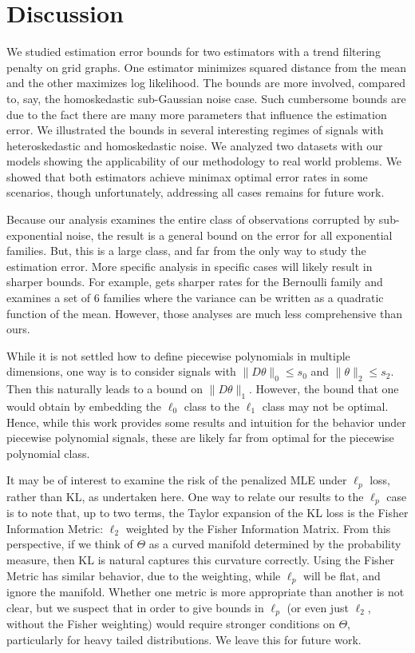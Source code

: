\documentclass[ejs,noshowframe]{imsart}
\theoremstyle{plain}
\theoremstyle{definition}
\begin{document}
\section{Discussion}
We studied estimation error bounds for two estimators with a trend filtering
penalty on grid graphs. One estimator minimizes squared distance from the mean
and the other maximizes log likelihood. The bounds are more involved, compared
to, say, the homoskedastic sub-Gaussian noise case. Such cumbersome bounds are
due 
to the fact there are many more parameters that influence the estimation error.
We illustrated the bounds in several interesting regimes of signals with
heteroskedastic and homoskedastic noise. We analyzed two datasets with our
models showing the applicability of our methodology to real world problems. We
showed that both estimators achieve minimax optimal error rates in some
scenarios, though unfortunately, addressing all cases remains for future work.

Because our analysis examines the entire class of observations corrupted by
sub-exponential noise, the result is a general bound on the error for all exponential families. But,
this is a large class, and far from the only way to study the estimation error.
More specific analysis in specific cases will likely result in sharper bounds.
For example, \cite{vandeGeer2020logistic} gets sharper rates for the Bernoulli
family and \cite{brown2010nonparametric} examines a set of 6 families where the
variance can be written as a quadratic function of the mean. However, those
analyses are much less comprehensive than ours.

While it is not settled how to define piecewise polynomials in multiple
dimensions, one way is to consider signals with $\| D \theta \|_0 \le s_0$ and
$\| \theta \|_2 \le s_2$.  Then this naturally leads to a bound on $\| D \theta
\|_1$. However, the bound that one would obtain by embedding the $\ell_0$ class
to the $\ell_1$ class may not be optimal. Hence, while this work provides some
results and intuition for the behavior under piecewise polynomial signals, these
are likely far from optimal for the piecewise polynomial class.

It may be of interest to examine the risk of the penalized MLE under $\ell_p$
loss, rather than KL, as undertaken here. One way to relate our results to the
$\ell_p$ case is to note that, up to two terms, the Taylor expansion of the KL
loss is the Fisher Information Metric: $\ell_2$ weighted by the Fisher
Information Matrix. From this perspective, if we think of $\Theta$ as a curved
manifold determined by the probability measure, then KL is natural captures this
curvature correctly. Using the Fisher Metric has similar behavior, due to the
weighting, while $\ell_p$ will be flat, and ignore the manifold. Whether one
metric is more appropriate than another is not clear, but we suspect that in
order to give bounds in $\ell_p$ (or even just $\ell_2$, without the Fisher
weighting) would require stronger conditions on $\Theta$, particularly for heavy
tailed distributions. We leave this for future work.
\end{document}
